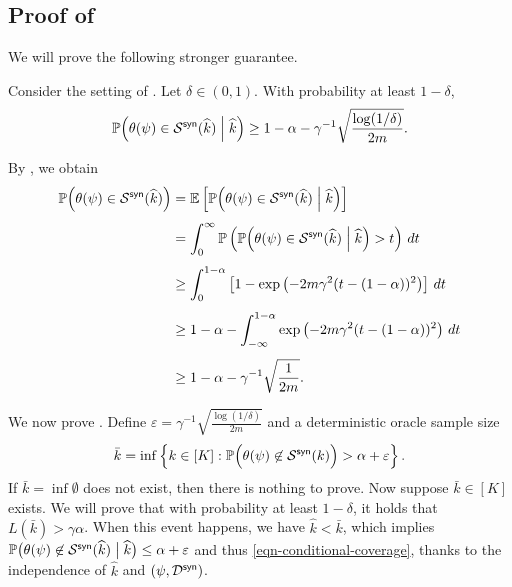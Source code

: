 \subsection{Proof of }\label{sec-thm-coverage-proof}

We will prove the following stronger guarantee.

\begin{lemma}\label{lem-conditional-coverage}
Consider the setting of . Let $\delta\in(0,1)$. With probability at least $1-\delta$,
\begin{equation}\label{eqn-conditional-coverage}
\mathbb{P}\Big( \theta(\psi)  \in {\mathcal{S}}^{\mathsf{syn}}(\widehat{k}) \Bigm| \widehat{k} \Big) \ge 1 - \alpha - \gamma^{-1} \sqrt{\frac{\log(1/\delta)}{2m}}.
\end{equation}
\end{lemma}

By , we obtain
\begin{align*}
\mathbb{P}\Big( \theta (\psi)  \in {\mathcal{S}}^{\mathsf{syn}}(\widehat{k}) \Big)
&=
\mathbb{E}\left[ \mathbb{P} \Big( \theta (\psi)  \in {\mathcal{S}}^{\mathsf{syn}}(\widehat{k}) \Bigm| \widehat{k} \Big) \right] \\[4pt]
&=
\int_0^{\infty} \mathbb{P} \left( \mathbb{P} \Big( \theta (\psi)  \in {\mathcal{S}}^{\mathsf{syn}}(\widehat{k}) \Bigm| \widehat{k} \Big) > t \right) \,dt \\[4pt]
&\ge 
\int_0^{1-\alpha} \left[ 1 - \exp\left( -2m\gamma^2 (t - (1-\alpha) )^2 \right) \right] \,dt \\[4pt]
&\ge 
1-\alpha - \int_{-\infty}^{1-\alpha} \exp\left( -2m\gamma^2 (t - (1-\alpha) )^2 \right) \,dt \\[4pt]
&\ge 
1-\alpha - \gamma^{-1} \sqrt{\frac{1}{2m}}.
\end{align*}

We now prove . Define $\varepsilon = \gamma^{-1} \sqrt{\frac{\log(1/\delta)}{2m}} $ and a deterministic oracle sample size
\begin{equation}\label{eqn-oracle-k}
\bar{k} = \inf \left\{ k\in [K] : \mathbb{P} \Big( \theta (\psi)  \not\in {\mathcal{S}}^{\mathsf{syn}}(k) \Big)  
> \alpha + \varepsilon \right\}.
\end{equation}
If $\bar{k} = \inf \emptyset$ does not exist, then there is nothing to prove. Now suppose $\bar{k} \in [K]$ exists. We will prove that with probability at least $1-\delta$, it holds that $L(\bar{k}) > \gamma\alpha$. When this event happens, we have $\widehat{k} < \bar{k}$, which implies $\mathbb{P}\big( \theta (\psi)  \not\in {\mathcal{S}}^{\mathsf{syn}}(\widehat{k}) \bigm| \widehat{k} \big) \le \alpha+\varepsilon$ and thus \eqref{eqn-conditional-coverage}, thanks to the independence of $\widehat{k}$ and $(\psi,\mathcal{D}^{\mathsf{syn}})$.

